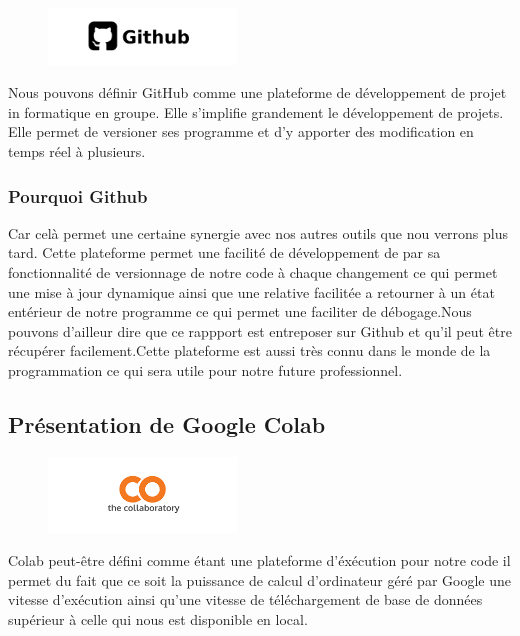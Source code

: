 \begin{figure}[h]
  \begin{center}
  \includegraphics[width=5cm]{./images/github.jpg}
  \end{center}
\end{figure}

Nous pouvons définir GitHub comme une plateforme de développement de projet in formatique en groupe. Elle s'implifie grandement le développement de projets. Elle permet de versioner ses programme et d'y apporter des modification en temps réel à plusieurs.

\subsubsection{Pourquoi Github}
Car celà permet une certaine synergie avec nos autres outils que nou verrons plus tard. Cette plateforme permet une facilité de développement de par sa fonctionnalité de versionnage de notre code à chaque changement ce qui permet une mise à jour dynamique ainsi que une relative facilitée a retourner à un état entérieur de notre programme ce qui permet une faciliter de débogage.Nous pouvons d'ailleur dire que ce rappport est entreposer sur Github et qu'il peut être récupérer facilement.Cette plateforme est aussi très connu dans le monde de la programmation ce qui sera utile pour notre future professionnel.

\subsection{Présentation de Google Colab}

\begin{figure}[h]
\begin{center}
\includegraphics[width=5cm]{./images/Colab_logo.png}
\end{center}
\end{figure}

Colab peut-être défini comme étant une plateforme d'éxécution pour notre code
il permet du fait que ce soit la puissance de calcul d'ordinateur géré par Google une vitesse d'exécution ainsi qu'une vitesse de téléchargement de base de données supérieur à celle qui nous est disponible en local.

